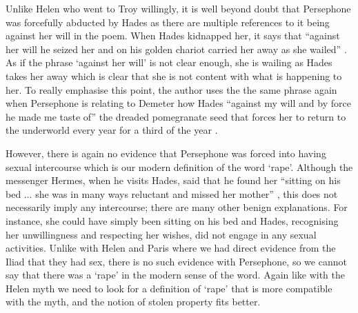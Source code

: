\documentclass[11pt]{article}
\begin{document}
Unlike Helen who went to Troy willingly, it is well beyond doubt that Persephone was forcefully abducted by Hades as there are multiple references to it being against her will in the poem.
When Hades kidnapped her, it says that ``against her will he seized her and on his golden chariot carried her away as she wailed'' \cite[line 19]{persephone}.
As if the phrase `against her will' is not clear enough, she is wailing as Hades takes her away which is clear that she is not content with what is happening to her.
To really emphasise this point, the author uses the the same phrase again when Persephone is relating to Demeter how Hades ``against my will and by force he made me taste of'' the dreaded pomegranate seed that forces her to return to the underworld every year for a third of the year \cite[line 412]{persephone}.

However, there is again no evidence that Persephone was forced into having sexual intercourse which is our modern definition of the word `rape'.
Although the messenger Hermes, when he visits Hades, said that he found her ``sitting on his bed ... she was in many ways reluctant and missed her mother'' \cite[line 344]{persephone}, this does not necessarily imply any intercourse; there are many other benign explanations.
For instance, she could have simply been sitting on his bed and Hades, recognising her unwillingness and respecting her wishes, did not engage in any sexual activities.
Unlike with Helen and Paris where we had direct evidence from the Iliad that they had sex, there is no such evidence with Persephone, so we cannot say that there was a `rape' in the modern sense of the word.
Again like with the Helen myth we need to look for a definition of `rape' that is more compatible with the myth, and the notion of stolen property fits better.
\end{document}
